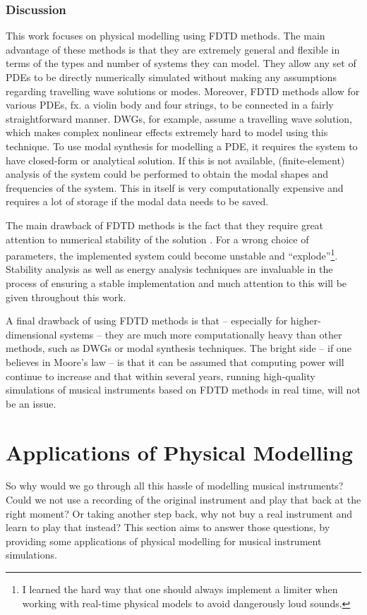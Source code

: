 \subsubsection{Discussion}
This work focuses on physical modelling using FDTD methods. The main advantage of these methods is that they are extremely general and flexible in terms of the types and number of systems they can model. They allow any set of PDEs to be directly numerically simulated without making any assumptions regarding travelling wave solutions or modes. Moreover, FDTD methods allow for various PDEs, fx. a violin body and four strings, to be connected in a fairly straightforward manner. DWGs, for example, assume a travelling wave solution, which makes complex nonlinear effects extremely hard to model using this technique. To use modal synthesis for modelling a PDE, it requires the system to have closed-form or analytical solution. If this is not available, (finite-element) analysis of the system could be performed to obtain the modal shapes and frequencies of the system. This in itself is very computationally expensive and requires a lot of storage if the modal data needs to be saved. 
 
The main drawback of FDTD methods is the fact that they require great attention to numerical stability of the solution \cite{theBible}. For a wrong choice of parameters, the implemented system could become unstable and ``explode''\footnote{I learned the hard way that one should always implement a limiter when working with real-time physical models to avoid dangerously loud sounds.}. Stability analysis as well as energy analysis techniques are invaluable in the process of ensuring a stable implementation and much attention to this will be given throughout this work.

A final drawback of using FDTD methods is that -- especially for higher-dimensional systems -- they are much more computationally heavy than other methods, such as DWGs or modal synthesis techniques. The bright side -- if one believes in Moore's law \cite{Moore1965} -- is that it can be assumed that computing power will continue to increase and that within several years, running high-quality simulations of musical instruments based on FDTD methods in real time, will not be an issue.

\section{Applications of Physical Modelling}\label{sec:why}
So why would we go through all this hassle of modelling musical instruments? Could we not use a recording of the original instrument and play that back at the right moment? Or taking another step back, why not buy a real instrument and learn to play that instead? This section aims to answer those questions, by providing some applications of physical modelling for musical instrument simulations. 

